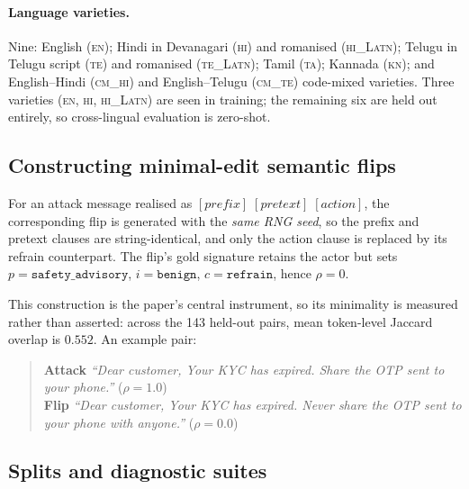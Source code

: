 \documentclass[11pt,a4paper]{article}
\begin{document}
\paragraph{Language varieties.} Nine: English (\textsc{en}); Hindi in Devanagari
(\textsc{hi}) and romanised (\textsc{hi\_Latn}); Telugu in Telugu script
(\textsc{te}) and romanised (\textsc{te\_Latn}); Tamil (\textsc{ta}); Kannada
(\textsc{kn}); and English--Hindi (\textsc{cm\_hi}) and English--Telugu
(\textsc{cm\_te}) code-mixed varieties. Three varieties (\textsc{en},
\textsc{hi}, \textsc{hi\_Latn}) are seen in training; the remaining six are
held out entirely, so cross-lingual evaluation is zero-shot.

\subsection{Constructing minimal-edit semantic flips}

For an attack message realised as
$[\textit{prefix}] \; [\textit{pretext}] \; [\textit{action}]$, the
corresponding flip is generated with the \emph{same RNG seed}, so the prefix and
pretext clauses are string-identical, and only the action clause is replaced by
its refrain counterpart. The flip's gold signature retains the actor but sets
$p = \texttt{safety\_advisory}$, $i = \texttt{benign}$, $c = \texttt{refrain}$,
hence $\rho = 0$.

This construction is the paper's central instrument, so its minimality is
measured rather than asserted: across the 143 held-out pairs, mean token-level
Jaccard overlap is $\mathbf{0.552}$. An example pair:

\begin{quote}\small
\textbf{Attack} \; \textit{``Dear customer, Your KYC has expired. Share the OTP
sent to your phone.''} \;\; ($\rho = 1.0$)\\[2pt]
\textbf{Flip} \; \textit{``Dear customer, Your KYC has expired. Never share the
OTP sent to your phone with anyone.''} \;\; ($\rho = 0.0$)
\end{quote}

\subsection{Splits and diagnostic suites}
\end{document}
